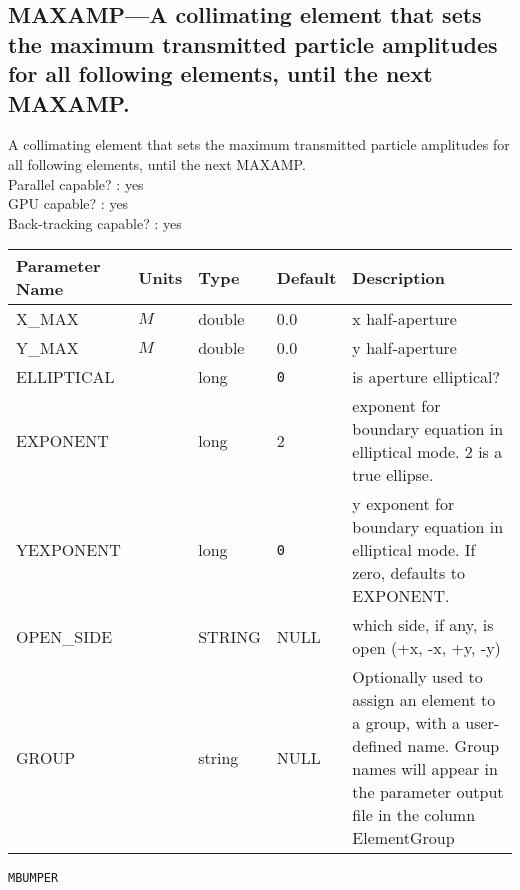 \subsection{MAXAMP---A collimating element that sets the maximum transmitted particle amplitudes for all following elements, until the next MAXAMP.}
A collimating element that sets the maximum transmitted particle amplitudes for all following elements, until the next MAXAMP.
\\
Parallel capable? : yes\\
GPU capable? : yes\\
Back-tracking capable? : yes\\
\begin{tabular}{|l|l|l|l|p{\descwidth}|} \hline
Parameter Name & Units & Type & Default & Description \\ \hline 
X\_MAX & $M$ & double &  0.0 & x half-aperture  \\ \hline 
Y\_MAX & $M$ & double &  0.0 & y half-aperture  \\ \hline 
ELLIPTICAL &  & long &  \verb|0| & is aperture elliptical?  \\ \hline 
EXPONENT &  & long &   2               & exponent for boundary equation in elliptical mode.  2 is a true ellipse.  \\ \hline 
YEXPONENT &  & long &  \verb|0| & y exponent for boundary equation in elliptical mode.  If zero, defaults to EXPONENT.  \\ \hline 
OPEN\_SIDE &  & STRING &   NULL            & which side, if any, is open (+x, -x, +y, -y)  \\ \hline 
GROUP &  & string & NULL & Optionally used to assign an element to a group, with a user-defined name.  Group names will appear in the parameter output file in the column ElementGroup  \\ \hline 
\end{tabular}

\vspace*{0.5in}

\newpage
\begin{center}{\Large\verb|MBUMPER|}\end{center}
